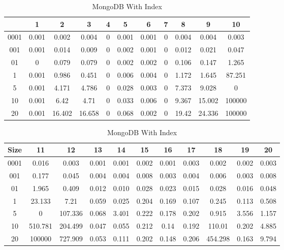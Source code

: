 \begin{center}
\begin{table} [ht]
\tiny
\caption{MongoDB With Index}
\label{mongodb-query-result-table}
\begin{tabular}{|c|c|c|c|c|c|c|c|c|c|c| } 
    &  1 & 2 & 3 & 4 & 5 & 6 & 7 & 8 & 9 & 10 \\
 \hline
0001 & 0.001 & 0.002 & 0.004 & 0 & 0.001 & 0.001 & 0 & 0.004 & 0.004 & 0.003	\\
001 & 0.001 & 0.014 & 0.009 & 0 & 0.002 & 0.001 & 0 & 0.012 & 0.021 & 0.047	\\
01 & 0 & 0.079 & 0.079 & 0 & 0.002 & 0.002 & 0 & 0.106 & 0.147 & 1.265	\\
1 & 0.001 & 0.986 & 0.451 & 0 & 0.006 & 0.004 & 0 & 1.172 & 1.645 & 87.251	\\
5 & 0.001 & 4.171 & 4.786 & 0 & 0.028 & 0.003 & 0 & 7.373 & 9.028 & 0	\\
10 & 0.001 & 6.42 & 4.71 & 0 & 0.033 & 0.006 & 0 & 9.367 & 15.002 & 100000	\\
20 & 0.001 & 16.402 & 16.658 & 0 & 0.068 & 0.002 & 0 & 19.42 & 24.336 & 100000	\\

\end{tabular}
\begin{tabular}{|c|c|c|c|c|c|c|c|c|c|c| } 
Size & 11 & 12 & 13 & 14 & 15 & 16 & 17 & 18 & 19 & 20	\\
\hline
0001 & 0.016 & 0.003 & 0.001 & 0.001 & 0.002 & 0.001 & 0.003 & 0.002 & 0.002 & 0.003	\\
001 & 0.177 & 0.045 & 0.004 & 0.004 & 0.008 & 0.003 & 0.004 & 0.006 & 0.003 & 0.008	\\
01 & 1.965 & 0.409 & 0.012 & 0.010 & 0.028 & 0.023 & 0.015 & 0.028 & 0.016 & 0.048	\\
1 & 23.133 & 7.21 & 0.059 & 0.025 & 0.204 & 0.169 & 0.107 & 0.245 & 0.113 & 0.508	\\
5 & 0 & 107.336 & 0.068 & 3.401 & 0.222 & 0.178 & 0.202 & 0.915 & 3.556 & 1.157	\\
10 & 510.781 & 204.499 & 0.047 & 0.055 & 0.212 & 0.14 & 0.192 & 110.01 & 0.202 & 4.885	\\
20 & 100000 & 727.909 & 0.053 & 0.111 & 0.202 & 0.148 & 0.206 & 454.298 & 0.163 & 9.794	\\


\end{tabular}
\end{table}




\end{center}
